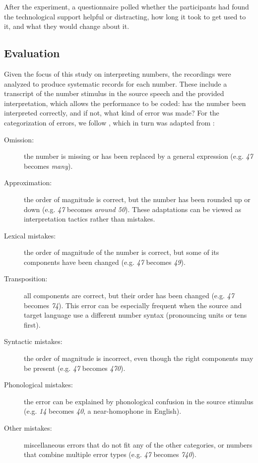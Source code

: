 \documentclass[output=paper]{langsci/langscibook}
\begin{document}
After the experiment, a questionnaire polled whether the participants had found the technological support helpful or distracting, how long it took to get used to it, and what they would change about it.

\subsection{Evaluation}
Given the focus of this study on interpreting numbers, the recordings were analyzed to produce systematic records for each number. These include a transcript of the number stimulus in the source speech and the provided interpretation, which allows the performance to be coded: has the number been interpreted correctly, and if not, what kind of error was made? For the categorization of errors, we follow \citet{Pinochi2009}, which in turn was adapted from \citet{Braun1996}:

\begin{description}
\item[Omission:] the number is missing or has been replaced by a general expression (e.g. \textit{47} becomes \textit{many}).
\item[Approximation:] the order of magnitude is correct, but the number has been rounded up or down (e.g. \textit{47} becomes \textit{around 50}). These adaptations can be viewed as interpretation tactics rather than mistakes.
\item[Lexical mistakes:] the order of magnitude of the number is correct, but some of its components have been changed (e.g. \textit{47} becomes \textit{49}).
\item[Transposition:] all components are correct, but their order has been changed (e.g. \textit{47} becomes \textit{74}). This error can be especially frequent when the source and target language use a different number syntax (pronouncing units or tens first).
\item[Syntactic mistakes:] the order of magnitude is incorrect, even though the right components may be present (e.g. \textit{47} becomes \textit{470}).
\item[Phonological mistakes:] the error can be explained by phonological confusion in the source stimulus (e.g. \textit{14} becomes \textit{40}, a near-homophone in English).
\item[Other mistakes:] miscellaneous errors that do not fit any of the other categories, or numbers that combine multiple error types (e.g. \textit{47} becomes \textit{740}).
\end{description}
\end{document}
